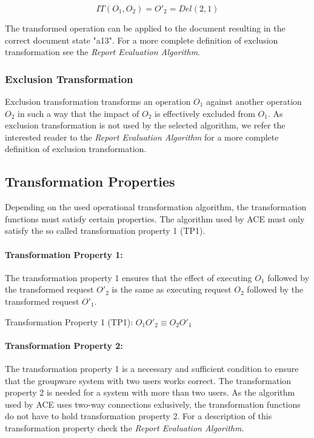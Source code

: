 $$ IT(O_1,O_2) = O'_2 = Del(2,1) $$

The transformed operation can be applied to the document resulting in the
correct document state "a13". For a more complete definition of exclusion
transformation see the \emph{Report Evaluation Algorithm}.

\subsubsection{Exclusion Transformation}
Exclusion transformation transforms an operation $O_1$ against another operation
$O_2$ in such a way that the impact of $O_2$ is effectively excluded from
$O_1$. As exclusion transformation is not used by the selected algorithm, we
refer the interested reader to the \emph{Report Evaluation Algorithm} for
a more complete definition of exclusion transformation. 


\subsection{Transformation Properties}
Depending on the used operational transformation algorithm, the transformation
functions must satisfy certain properties. The algorithm used by ACE must
only satisfy the so called transformation property 1 (TP1). 

\paragraph{Transformation Property 1:}
The transformation property 1 ensures that the effect of executing $O_1$
followed by the transformed request $O'_2$ is the same as executing
request $O_2$ followed by the transformed request $O'_1$.

\begin{defn}
Transformation Property 1 (TP1):
$ O_1 O'_2 \equiv O_2 O'_1 $
\end{defn}

\paragraph{Transformation Property 2:}
The transformation property 1 is a necessary and sufficient condition to
ensure that the groupware system with two users works correct. The
transformation property 2 is needed for a system with more than two users.
As the algorithm used by ACE uses two-way connections exlusively, the
transformation functions do not have to hold transformation property 2.
For a description of this transformation property check the 
\emph{Report Evaluation Algorithm}.




